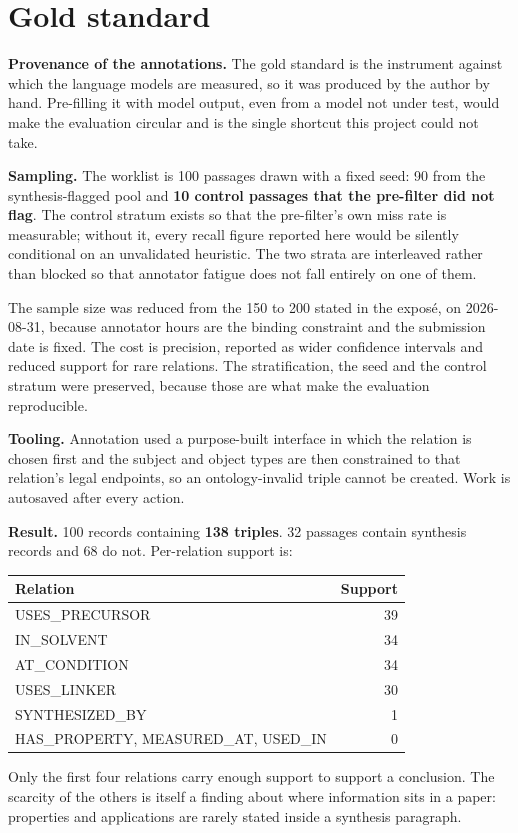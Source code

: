 \documentclass[11pt,a4paper,oneside]{report}
\begin{document}
\section{Gold standard}

\textbf{Provenance of the annotations.} The gold standard is the instrument against which the language models are measured, so it was produced by the author by hand. Pre-filling it with model output, even from a model not under test, would make the evaluation circular and is the single shortcut this project could not take.

\textbf{Sampling.} The worklist is 100 passages drawn with a fixed seed: 90 from the synthesis-flagged pool and \textbf{10 control passages that the pre-filter did not flag}. The control stratum exists so that the pre-filter's own miss rate is measurable; without it, every recall figure reported here would be silently conditional on an unvalidated heuristic. The two strata are interleaved rather than blocked so that annotator fatigue does not fall entirely on one of them.

The sample size was reduced from the 150 to 200 stated in the exposé, on 2026-08-31, because annotator hours are the binding constraint and the submission date is fixed. The cost is precision, reported as wider confidence intervals and reduced support for rare relations. The stratification, the seed and the control stratum were preserved, because those are what make the evaluation reproducible.

\textbf{Tooling.} Annotation used a purpose-built interface in which the relation is chosen first and the subject and object types are then constrained to that relation's legal endpoints, so an ontology-invalid triple cannot be created. Work is autosaved after every action.

\textbf{Result.} 100 records containing \textbf{138 triples}. 32 passages contain synthesis records and 68 do not. Per-relation support is:

\par\medskip
\begingroup
\small\setlength{\tabcolsep}{6pt}
\begin{tabular}{@{}lr@{}}
\toprule
\textbf{Relation} & \textbf{Support} \\
\midrule
USES\_PRECURSOR & 39 \\
IN\_SOLVENT & 34 \\
AT\_CONDITION & 34 \\
USES\_LINKER & 30 \\
SYNTHESIZED\_BY & 1 \\
HAS\_PROPERTY, MEASURED\_AT, USED\_IN & 0 \\
\bottomrule
\end{tabular}
\endgroup
\par\medskip
Only the first four relations carry enough support to support a conclusion. The scarcity of the others is itself a finding about where information sits in a paper: properties and applications are rarely stated inside a synthesis paragraph.
\end{document}
